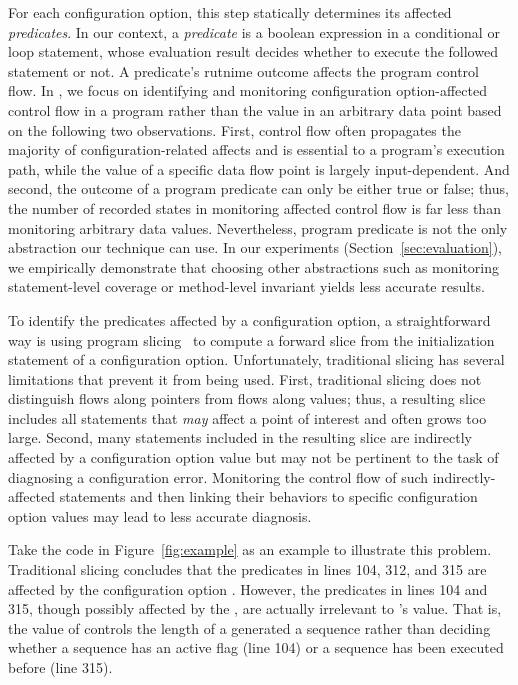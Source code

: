 For each configuration option, this step statically determines
its affected \textit{predicates}. In our context, a \textit{predicate}
is a boolean expression in a conditional or loop statement, whose evaluation result
decides whether to execute the followed statement or not.
A predicate's rutnime outcome affects the program control flow.
In \ourtool, we focus on identifying and monitoring 
configuration option-affected control flow in a program
rather than the value in an arbitrary data point based on the
following two observations. First, control flow 
often propagates the majority of configuration-related affects
and is essential to a program's execution path, while
the value of a specific data flow point is largely input-dependent.
And second, the outcome of a program predicate can only be
either true or false; thus, the number of recorded states in monitoring
affected control flow is far less than monitoring arbitrary
data values.  Nevertheless, program predicate is not the only
abstraction our technique can use. In our experiments (Section~\ref{sec:evaluation}),
we empirically demonstrate that choosing other abstractions
such as monitoring statement-level coverage
or method-level invariant yields less accurate results.


To identify the predicates affected by a configuration option, a straightforward
way is using program slicing~\cite{Horwitz:1988} to compute
a forward slice from the initialization statement of a
configuration option. Unfortunately, traditional slicing has
several limitations that prevent it from being used.
First, traditional slicing does not distinguish flows along
pointers from flows along values; thus, a resulting slice includes all statements that
\textit{may} affect a point of interest and often grows too large. Second,
many statements included in the resulting slice are indirectly
affected by a configuration option value but may not be pertinent
to the task of diagnosing a configuration error.
Monitoring the control flow of such indirectly-affected statements 
and then linking their behaviors to specific configuration option values
may lead to less accurate diagnosis.

Take the code in Figure~\ref{fig:example} as an example to illustrate
this problem.  Traditional slicing concludes that the predicates
in lines 104, 312, and 315 are affected by the configuration option .
However, the predicates in lines 104 and 315, though possibly
affected by the , are actually irrelevant
to 's value. That is, the value of 
controls the length of a generated a sequence rather
than deciding whether a sequence has an active flag (line 104) or
a sequence has been executed before (line 315).

